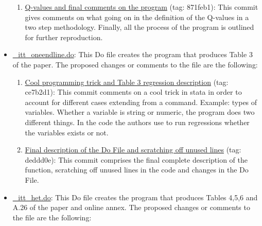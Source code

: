 \documentclass{article}
\begin{document}
\begin{itemize}
\begin{enumerate}[label=\roman*,resume]
                \item \href{https://github.com/jorgeluis8ar/Revised-reproduction-package-for-Abebe-et-al-2021/commit/871feb1a4f6ccdebbcbd5250ddb309804220a147}{Q-values and final comments on the program} (tag: 871feb1): This commit gives comments on what going on in the definition of the Q-values in a two step methodology. Finally, all the process of the program is outlined for further reproduction.
                
            \end{enumerate}
            
        \item \href{https://github.com/jorgeluis8ar/Revised-reproduction-package-for-Abebe-et-al-2021/blob/main/Proposed\%20Replication\%20File/utilities/_itt_oneendline.do}{\_itt\_oneendline.do}: This Do file creates the program that produces Table 3 of the paper. The proposed changes or comments to the file are the following:
        
            \begin{enumerate}[label=\roman*,resume]
            
                \item \href{https://github.com/jorgeluis8ar/Revised-reproduction-package-for-Abebe-et-al-2021/commit/ce7b2d1546f0be8c1006b62b1fcb8fa08944bc8f}{Cool programming trick and Table 3 regression description} (tag: ce7b2d1): This commit comments on a cool trick in stata in order to account for different cases extending from a command. Example: types of variables. Whether a variable is string or numeric, the program does two different things. In the code the authors use to run regressions whether the variables exists or not.
                
                \item \href{https://github.com/jorgeluis8ar/Revised-reproduction-package-for-Abebe-et-al-2021/commit/deddd0e0e7c3b0dc6bd1a2ce24abf29283bc6d8e}{Final description of the Do File and scratching off unused lines} (tag: deddd0e): This commit comprises the final complete description of the function, scratching off unused lines in the code and changes in the Do File. 
                
            \end{enumerate}
    
        \item \href{https://github.com/jorgeluis8ar/Revised-reproduction-package-for-Abebe-et-al-2021/blob/main/Proposed\%20Replication\%20File/utilities/_itt_het.do}{\_itt\_het.do}: This Do file creates the program that produces Tables 4,5,6 and A.26 of the paper and online annex. The proposed changes or comments to the file are the following:
        

\end{itemize}
\end{document}
